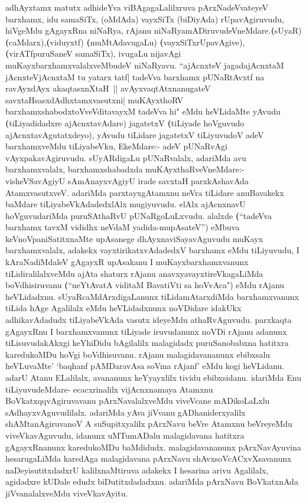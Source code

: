 \begin{artha}
adhAyxtamx matutx adhideYva viBAgagaLalilxruva pArxNadeVvateyeV barxhamx, idu  samaSiTx, (oMdAda) vayxSiTx (biDiyAda) rUpavAgiruvudu, hiVgeMdu gAgayxRna niNaRya, rAjanu niNaRyamADiruvudeVneMdare.\textbf(sUyaR) \textbf(caMdarx),\textbf(viduyxtf) \textbf(muMtAdavugaLu) \textbf(vayxSiTxrUpavAgive),\textbf(virATfpuruSaneV samaSiTx), ivugaLu nijavAgi muKayxbarxhamxvalalxveMbudeV niNaRyavu. ``ajAcnxteV jagadajAcnxtaM jAcnxteV\-jAcnxtaM tu yatarx tatf| tadeVva barxhamx pUNaRtAvxtf na ravAyxdAyx akaqtasxnXtaH~|| avAyxvaqtAtxnanugateV savxtaHsasxdAdhxtamxvasutxni| muKAyxthoRV barxhamxshabodx\s toV\break veVditavayxM tadeVva hi" eMdu heVLidaMte yAvudu \textbf(tiLiyadidadxre ajAcnxtavAdare) jagatetxV  \textbf(tiLiyade hoVguvudo ajAcnxtavAgutatxdeyo), yAvudu tiLidare jagatetxV tiLiyuvudoV adeV barxhamxveMdu tiLiyabeVku, EkeMdare:- adeV pUNaRvAgi  vAyxpakavAgiruvudu. sUyARdigaLu pUNaRvalalx, adariMda avu barxhamxvalalx, barxhamxshabadxda muKAyxthaRveVneMdare:- visheVSavAgiyU sAmAnayxvAgiyU irade savxtaH parxkAshavAda AtamxvasutxveV. adariMda parxtayxgAtamxnu neVra tiLidare anuBavakekx baMdare tiLiyabeVkAdadedxlAlx mugiyuvudu. elAlx ajAcnxnavU hoVguvudariMda puruSAthaRvU pUNaRgoLuLxvudu. alalxde \textbf(``tadeVva barxhamx tavxM vididhx neVdaM yadida-mupAsateV'') eMbuva keVnoVpaniSatitxnaMte upAsanege  dhAyxnaviSayavAguvudu muKayx barxhamxvalalx, adakekx vayxtirikatxvAdadedxV barxhamx eMdu tiLiyuvudu, I kAraNadiMdaleV gAgayxR upAsakanu I muKayxbarxhamxvanunx tiLidiralilalxveMdu ajAta shaturx rAjanu anavxyavayxtireVkagaLiMda boVdhisiruvanu \textbf(``neYtAvatA viditaM BavatiVti sa hoVvAca") eMdu rAjanu heVLidadxnu. sUyaRcaMdArxdigaLanunx tiLidamAtarxdiMda barxhamxvanunx tiLida hAge Agalilalx eMdu heVLidadxnunx noVDidare idakUkx adhikavAdadudx tiLiyabeVkAda vasutx ideyeMdu athaRvAguvudu. parxkaqta gAgayxRnu I barxhamxvanunx tiLiyade iruvudanunx noVDi rAjanu adanunx tiLisuvudakAkxgi keYhiDidu bAgilalilx malagidadx puruSanobabxna hatitxra karedukoMDu hoVgi boVdhisuvanu. rAjanu malagidavananunx ebibxsalu heVLuvaMte' `baqhanf pAMDaravAsa soVma rAjanf' eMdu kogi heVLidanu. adarU Atanu ELalilalx, avananunx keYyayxlilx tividu ebibxsidanu. idariMda Enu tiLiyuvudeMdare- ecacxrinalilx vijAcnxnamaya Atamxnu BoVkatxqqvAgiruvavanu pArxNavalalxveMdu viveVcane mADikoLaLxlu sAdhayxvAguvudilalx. adariMda yAva jiVvanu gADhaniderxyalilx shAMtanAgiruvanoV A suSupitxyalilx pArxNavu beVre Atamxnu beVreyeMdu viveVkavAguvudu, idanunx uMTumADalu malagidavana hatitxra  gAgayxRnanunx karedukoMDu baMdidudx. malagidavananunx pArxNavAyuvina hesarugaLiMda karedAga malagidavana pArxNavu shAvxsoVcACxvXsavanunx naDeyisutitxdadxrU kalilxnaMtiruva adakekx I hesarina arivu Agalilalx, agidadxre kUDale edudx biDutitxdadadxnu. adariMda pArxNavu BoVkatxnAda jiVvanalalxveMdu viveVkavAyitu. 
\end{artha}

